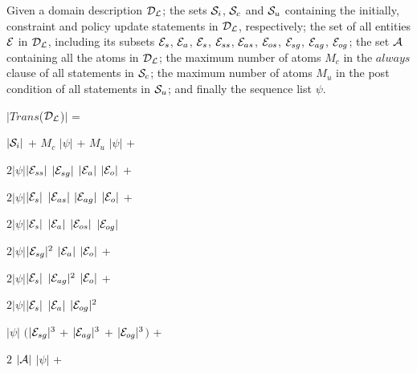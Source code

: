 \documentclass[global,twocolumn,draft]{svjour}
\newenvironment{vtheorem}[1]
  {\begin{theorem}[#1]\hspace{0.25em}}
  {\end{theorem}}
\newenvironment{vquote}
  {\begin{list}{}{\leftmargin 1em}\item[]}
  {\end{list}}
\begin{document}
        \begin{vtheorem}{Translation Size}
          \label{the-size}
          Given a domain description ${\cal D_{L}}$; the sets ${\cal S}_{i}$,
          ${\cal S}_{c}$ and ${\cal S}_{u}$ containing the initially,
          constraint and policy update statements in ${\cal D_{L}}$,
          respectively; the set of all entities ${\cal E}$ in ${\cal D_{L}}$,
          including its subsets ${\cal E}_{s}$, ${\cal E}_{a}$, ${\cal E}_{s}$,
          ${\cal E}_{ss}$, ${\cal E}_{as}$, ${\cal E}_{os}$, ${\cal E}_{sg}$,
          ${\cal E}_{ag}$, ${\cal E}_{og}$; the set ${\cal A}$ containing all
          the atoms in ${\cal D_{L}}$; the maximum number of atoms $M_{c}$ in
          the $always$ clause of all statements in ${\cal S}_{c}$; the
          maximum number of atoms $M_{u}$ in the post condition of all
          statements in ${\cal S}_{u}$; and finally the sequence list $\psi$.

         \begin{vquote}
            $|$$Trans$(${\cal D_{L}}$)$|$ =

            \hspace{1em}
            $|{\cal S}_{i}|$ +
            $M_{c}$ $|\psi|$ +
            $M_{u}$ $|\psi|$ +

            \hspace{1em}
            $2|\psi|$$|{\cal E}_{ss}|$ $|{\cal E}_{sg}|$ $|{\cal E}_{a}|$ $|{\cal E}_{o}|$ +

            \hspace{1em}
            $2|\psi|$$|{\cal E}_{s}|$ $|{\cal E}_{as}|$ $|{\cal E}_{ag}|$ $|{\cal E}_{o}|$ +

            \hspace{1em}
            $2|\psi|$$|{\cal E}_{s}|$ $|{\cal E}_{a}|$ $|{\cal E}_{os}|$ $|{\cal E}_{og}|$

            \hspace{1em}
            $2|\psi|$$|{\cal E}_{sg}|^{2}$ $|{\cal E}_{a}|$ $|{\cal E}_{o}|$ +

            \hspace{1em}
            $2|\psi|$$|{\cal E}_{s}|$ $|{\cal E}_{ag}|^{2}$ $|{\cal E}_{o}|$ +

            \hspace{1em}
            $2|\psi|$$|{\cal E}_{s}|$ $|{\cal E}_{a}|$ $|{\cal E}_{og}|^{2}$

            \hspace{1em}
            $|\psi|$ $($$|{\cal E}_{sg}|^{3}$ +
            $|{\cal E}_{ag}|^{3}$ +
            $|{\cal E}_{og}|^{3}$$)$ +

            \hspace{1em}
            $2$ $|{\cal A}|$ $|\psi|$ +
          \end{vquote}
        \end{vtheorem}
\end{document}
